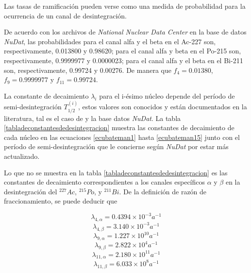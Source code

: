 Las tasas de ramificación pueden verse como una medida de probabilidad para la ocurrencia de un canal de desintegración. 

De acuerdo con los archivos de \textit{National Nuclear Data Center} en la base de datos \textit{NuDat}, las probabilidades para el canal alfa y el beta en el Ac-227 son, respectivamente, 0.013800 y 0.98620; para el canal alfa y beta en el Po-215 son, respectivamente, 0.9999977 y 0.0000023; para el canal alfa y el beta en el Bi-211 son, respectivamente, 0.99724 y 0.00276. De manera que $f_4=0.01380$, $f_9=0.9999977$ y $f_{11}=0.99724$.

La constante de decaimiento $\lambda_i$ para el i-ésimo núcleo depende del período de semi-desintegración $T_{1/2}^{(i)}$, estos valores son conocidos y están documentados en la literatura, tal es el caso de \cite{Flanagan1954} y la base datos \textit{NuDat}. La tabla \ref{tabladeconstantesdedesintegracion} muestra las constantes de decaimiento de cada núcleo en las ecuaciones \ref{ecubateman1} hasta \ref{ecubateman15} junto con el período de semi-desintegración que le concierne según \textit{NuDat} por estar más actualizado. 

Lo que no se muestra en la tabla \ref{tabladeconstantesdedesintegracion} es las constantes de decaimiento correspondientes a los canales específicos $\alpha$ y $\beta$ en la desintegración del $^227 Ac$, $^215 Po$, y $^211 Bi$. De la definición de razón de fraccionamiento, se puede deducir que

$$\lambda_{4,\alpha}=0.4394\times 10^{-3}\unit{a^{-1}}$$
$$\lambda_{4,\beta}=3.140\times 10^{-3}\unit{a^{-1}}$$
$$\lambda_{9,\alpha}=1.227\times 10^{10}\unit{a^{-1}}$$
$$\lambda_{9,\beta}=2.822\times 10^{4}\unit{a^{-1}}$$
$$\lambda_{11,\alpha}=2.180\times 10^{11}\unit{a^{-1}}$$
$$\lambda_{11,\beta}=6.033\times 10^{8}\unit{a^{-1}}$$

